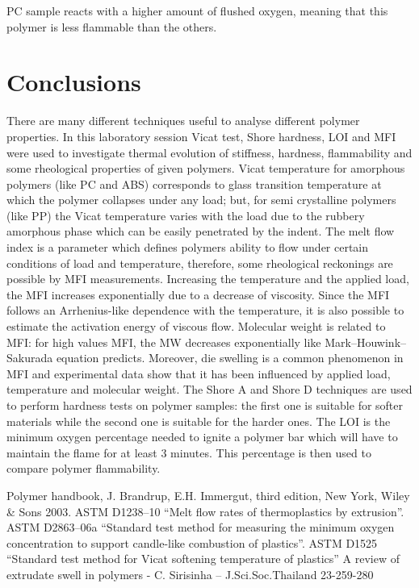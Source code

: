 \documentclass[a4paper, 11pt]{article}
\begin{document}
PC sample reacts with a higher amount of flushed oxygen, meaning that this polymer is less flammable than the others.
 
\section{Conclusions}

There are many different techniques useful to analyse different polymer properties. In this laboratory session Vicat test, Shore hardness, LOI and MFI were used to investigate thermal evolution of stiffness, hardness, flammability and some rheological properties of given polymers.
Vicat temperature for amorphous polymers (like PC and ABS) corresponds to glass transition temperature at which the polymer collapses under any load; but, for semi crystalline polymers (like PP) the Vicat temperature varies with the load due to the rubbery amorphous phase which can be easily penetrated by the indent.
The melt flow index is a parameter which defines polymers ability to flow under certain conditions of load and temperature, therefore, some rheological reckonings are possible by MFI measurements. Increasing the temperature and the applied load, the MFI increases exponentially due to a decrease of viscosity. Since the MFI follows an Arrhenius-like dependence with the temperature, it is also possible to estimate the activation energy of viscous flow. Molecular weight is related to MFI: for high values MFI, the MW decreases exponentially like Mark–Houwink–Sakurada equation predicts. Moreover, die swelling is a common phenomenon in MFI and experimental data show that it has been influenced by applied load, temperature and molecular weight.
The Shore A and Shore D techniques are used to perform hardness tests on polymer samples: the first one is suitable for softer materials while the second one is suitable for the harder ones.
The LOI is the minimum oxygen percentage needed to ignite a polymer bar which will have to maintain the flame for at least 3 minutes. This percentage is then used to compare polymer flammability.

\newpage

\thispagestyle{empty}

\begin{thebibliography}{1}

 Polymer handbook, J. Brandrup, E.H. Immergut, third edition, New York, Wiley \& Sons 2003.
 ASTM D1238–10 “Melt flow rates of thermoplastics by extrusion”. 
 ASTM D2863–06a “Standard test method for measuring the minimum oxygen concentration to support candle-like combustion of plastics”.
 ASTM D1525 “Standard test method for Vicat softening temperature of plastics”
 A review of extrudate swell in polymers - C. Sirisinha – J.Sci.Soc.Thailand 23-259-280

\end{thebibliography}
\end{document}
